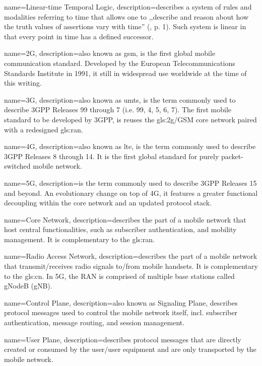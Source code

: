 {
    name={Linear-time Temporal Logic},
    description={describes a system of rules and modalities referring to time that allows one to ,,describe and reason about how the truth values of assertions vary
with time'' (\cite{emerson1990temporal}, p. 1). Such system is linear in that every point in time has a defined successor.}
}

{
    name={2G},
    description={also known as \gls{gsm}, is the first global mobile communication standard. Developed by the European Telecommunications Standards Institute in 1991, it still in widespread use worldwide at the time of this writing.}
}

{
    name={3G},
    description={also known as \gls{umts}, is the term commonly used to describe 3GPP Releases 99 through 7 (i.e. 99, 4, 5, 6, 7). The first mobile standard to be developed by 3GPP, is reuses the \gls{gls:2g}/GSM core network paired with a redesigned \gls{gls:ran}.}
}

{
    name={4G},
    description={also known as \gls{lte}, is the term commonly used to describe 3GPP Releases 8 through 14. It is the first global standard for purely packet-switched mobile network.}
}

{
    name={5G},
    description={is the term commonly used to describe 3GPP Releases 15 and beyond. An evolutionary change on top of 4G, it features a greater functional decoupling within the core network and an updated protocol stack.}
}

{
    name={Core Network},
    description={describes the part of a mobile network that host central functionalities, such as subscriber authentication, and mobility management. It is complementary to the \gls{gls:ran}.}
}

{
    name={Radio Access Network},
    description={describes the part of a mobile network that transmit/receives radio signals to/from mobile handsets. It is complementary to the \gls{gls:cn}. In 5G, the RAN is comprised of multiple base stations called gNodeB (gNB).}
}

{
    name={Control Plane},
    description={also known as Signaling Plane, describes protocol messages used to control the mobile network itself, incl. subscriber authentication, message routing, and session management.}
}

{
    name={User Plane},
    description={describes protocol messages that are directly created or consumed by the user/user equipment and are only transported by the mobile network.}
}